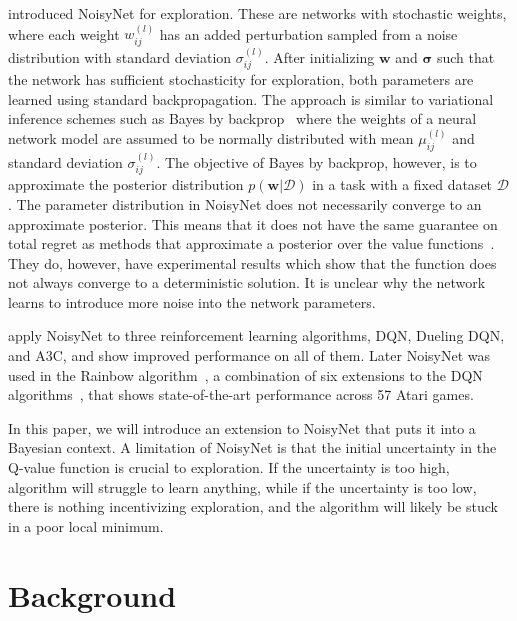 \documentclass[]{uai2022} %
\begin{document}
\citet{fortunato_noisy_2019} introduced NoisyNet for exploration.
These are networks with stochastic weights, where each weight \(w^{(l)}_{ij}\)
has an added perturbation sampled from a noise distribution with standard deviation \(\sigma^{(l)}_{ij}\).
After initializing \(\bm{w}\) and \(\bm{\sigma}\) such that the network has sufficient
stochasticity for exploration, both parameters are learned using standard backpropagation.
The approach is similar to variational inference schemes such as Bayes by backprop~\citep{blundell_weight_2015} where the weights of a neural network model are assumed to be normally distributed with mean 
\(\mu^{(l)}_{ij}\) and standard deviation \(\sigma^{(l)}_{ij}\). The objective of
Bayes by backprop, however, is to approximate the posterior distribution
\(p(\bm{w} \vert \mathcal{D})\) in a task with a fixed dataset \(\mathcal{D}\).
The parameter distribution in NoisyNet does not necessarily
converge to an approximate posterior. This means that it does not have the same
guarantee on total regret as methods that approximate a posterior over the
value functions~\citep{osband_generalization_2016}. They do, however, have
experimental results which show that the function does not always converge to
a deterministic solution. It is unclear why the network learns to introduce
more noise into the network parameters.

\citet{fortunato_noisy_2019} apply NoisyNet to three reinforcement learning
algorithms, DQN, Dueling DQN, and A3C, and show improved performance on all
of them. Later NoisyNet was used in the Rainbow 
algorithm~\citep{hessel_rainbow_2017}, a combination of six extensions to the
DQN algorithms~\citep{fortunato_noisy_2019, bellemare_distributional_2017, wang_dueling_2016,van_hasselt_deep_2015,schaul_prioritized_2016,mnih_asynchronous_2016}, that shows state-of-the-art performance across 57 Atari games.

In this paper, we will introduce an extension to NoisyNet that puts it into a Bayesian context. A limitation of NoisyNet is that the initial uncertainty in the Q-value function is crucial to exploration. If the uncertainty is too high, algorithm will struggle to learn anything, while if the uncertainty is too low, there is nothing incentivizing exploration, and the algorithm will likely be stuck in a poor local minimum.

\section{Background}
\end{document}
